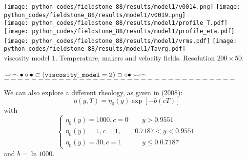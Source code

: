 \begin{center}
\texttt{[image: python\_codes/fieldstone\_88/results/model1/v0014.png]}
\texttt{[image: python\_codes/fieldstone\_88/results/model1/v0019.png]}\\
\texttt{[image: python\_codes/fieldstone\_88/results/model1/profile\_T.pdf]}
\texttt{[image: python\_codes/fieldstone\_88/results/model1/profile\_eta.pdf]}
\texttt{[image: python\_codes/fieldstone\_88/results/model1/vrms.pdf]}
\texttt{[image: python\_codes/fieldstone\_88/results/model1/Tavrg.pdf]}\\
{\captionfont viscosity model 1. Temperature, makers and velocity fields. Resolution $200\times 50$.}
\end{center}


\newpage
\begin{center}
$----------------------------------$\\
$\smile \frown \bullet \circ \bullet \subset ( {\tt viscosity\_model=2} ) \supset \circ \bullet \smile \frown$\\
$----------------------------------$
\end{center}

We can also explore a different rheology, as given in \textcite{brhv08} (2008):
\[
\eta(y,T) = \eta_0(y) \exp [-b(cT)]
\]
with 
\[
\left\{
\begin{array}{c}
\eta_0(y)=1000, c=0 \qquad y> 0.9551 \\
\eta_0(y)=1,    c=1, \qquad  0.7187  <y< 0.9551 \\
\eta_0(y)=30,   c=1  \qquad\quad y \le 0.0.7187
\end{array}
\right.
\]
and $b=\ln 1000$.

